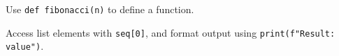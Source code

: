 Use \texttt{def fibonacci(n)} to define a function.

Access list elements with \texttt{seq[0]}, and
format output using \texttt{print(f"Result: {value}")}.
